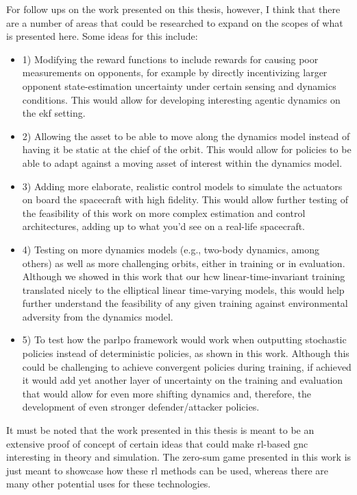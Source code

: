 For follow ups on the work presented on this thesis, however, I think that there are a number of areas that could be researched to expand on the scopes of what is presented here. Some ideas for this include:

\begin{itemize}

    \item 1) Modifying the reward functions to include rewards for causing poor measurements on opponents, for example by directly incentivizing larger opponent state-estimation uncertainty under certain sensing and dynamics conditions. This would allow for developing interesting agentic dynamics on the \acs{ekf} setting.

    \item 2) Allowing the asset to be able to move along the dynamics model instead of having it be static at the chief of the orbit. This would allow for policies to be able to adapt against a moving asset of interest within the dynamics model.

    \item 3) Adding more elaborate, realistic control models to simulate the actuators on board the spacecraft with high fidelity. This would allow further testing of the feasibility of this work on more complex estimation and control architectures, adding up to what you'd see on a real-life spacecraft.

    \item 4) Testing on more dynamics models (e.g., two-body dynamics, among others) as well as more challenging orbits, either in training or in evaluation. Although we showed in this work that our \acs{hcw} linear-time-invariant training translated nicely to the elliptical linear time-varying models, this would help further understand the feasibility of any given training against environmental adversity from the dynamics model.

    \item 5) To test how the \acs{parlpo} framework would work when outputting stochastic policies instead of deterministic policies, as shown in this work. Although this could be challenging to achieve convergent policies during training, if achieved it would add yet another layer of uncertainty on the training and evaluation that would allow for even more shifting dynamics and, therefore, the development of even stronger defender/attacker policies.
\end{itemize}


It must be noted that the work presented in this thesis is meant to be an extensive proof of concept of certain ideas that could make \acs{rl}-based \acs{gnc} interesting in theory and simulation. The zero-sum game presented in this work is just meant to showcase how these \acs{rl} methods can be used, whereas there are many other potential uses for these technologies.

